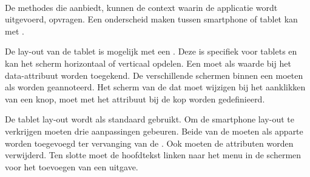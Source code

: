 \paragraph{\kendo}
De methodes die  aanbiedt, kunnen de context waarin de applicatie wordt uitgevoerd, opvragen.
Een onderscheid maken tussen smartphone of tablet kan met .

De lay-out van de tablet is mogelijk met een .
Deze  is specifiek voor tablets en kan het scherm horizontaal of verticaal opdelen.
Een  moet als waarde bij het data-attribuut  worden toegekend.
De verschillende schermen binnen een  moeten als  worden geannoteerd.
Het scherm van de  dat moet wijzigen bij het aanklikken van een knop, moet met het  attribuut bij de kop worden gedefinieerd.

De tablet lay-out wordt als standaard gebruikt.
Om de smartphone lay-out te verkrijgen moeten drie aanpassingen gebeuren.
Beide  van de  moeten als apparte  worden toegevoegd ter vervanging van de .
Ook moeten de  attributen worden verwijderd.
Ten slotte moet de hoofdtekst linken naar het menu in de schermen voor het toevoegen van een uitgave.



